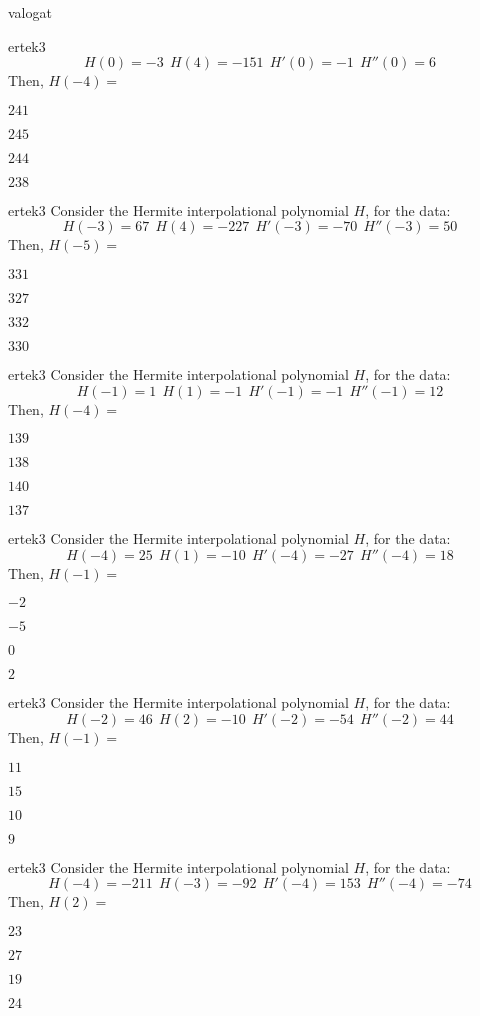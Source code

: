 \documentclass[12pt]{article}
\begin{document}
\begin{quiz}{valogat}
\begin{multi}{ertek3}
$$
H(0)=-3 \ \ H(4)=-151 \ \ H'(0)=-1 \ \ H''(0)=6
$$
Then, $H(-4)=$
\item* $ 241 $
\item  $ 245 $
\item  $ 244 $
\item  $ 238 $
\end{multi}\begin{multi}{ertek3}
Consider the Hermite interpolational polynomial $H$, for the data:
$$
H(-3)=67 \ \ H(4)=-227 \ \ H'(-3)=-70 \ \ H''(-3)=50
$$
Then, $H(-5)=$
\item* $ 331 $
\item  $ 327 $
\item  $ 332 $
\item  $ 330 $
\end{multi}\begin{multi}{ertek3}
Consider the Hermite interpolational polynomial $H$, for the data:
$$
H(-1)=1 \ \ H(1)=-1 \ \ H'(-1)=-1 \ \ H''(-1)=12
$$
Then, $H(-4)=$
\item* $ 139 $
\item  $ 138 $
\item  $ 140 $
\item  $ 137 $
\end{multi}\begin{multi}{ertek3}
Consider the Hermite interpolational polynomial $H$, for the data:
$$
H(-4)=25 \ \ H(1)=-10 \ \ H'(-4)=-27 \ \ H''(-4)=18
$$
Then, $H(-1)=$
\item* $ -2 $
\item  $ -5 $
\item  $ 0 $
\item  $ 2 $
\end{multi}\begin{multi}{ertek3}
Consider the Hermite interpolational polynomial $H$, for the data:
$$
H(-2)=46 \ \ H(2)=-10 \ \ H'(-2)=-54 \ \ H''(-2)=44
$$
Then, $H(-1)=$
\item* $ 11 $
\item  $ 15 $
\item  $ 10 $
\item  $ 9 $
\end{multi}\begin{multi}{ertek3}
Consider the Hermite interpolational polynomial $H$, for the data:
$$
H(-4)=-211 \ \ H(-3)=-92 \ \ H'(-4)=153 \ \ H''(-4)=-74
$$
Then, $H(2)=$
\item* $ 23 $
\item  $ 27 $
\item  $ 19 $
\item  $ 24 $

\end{multi}
\end{quiz}
\end{document}
